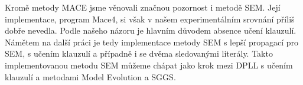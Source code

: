 Kromě metody MACE jsme
věnovali značnou pozornost i metodě SEM.
Její implementace, program Mace4, si však v našem experimentálním
srovnání příliš dobře nevedla. Podle našeho názoru
je hlavním důvodem absence učení klauzulí.
Námětem na další práci je tedy implementace metody SEM
s lepší propagací pro SEM, s učením klauzulí
a případně i se dvěma sledovanými literály.
Takto implementovanou metodu SEM můžeme chápat jako krok
mezi DPLL s učením klauzulí a metodami Model Evolution a SGGS.


%
%
%
%
%



%

